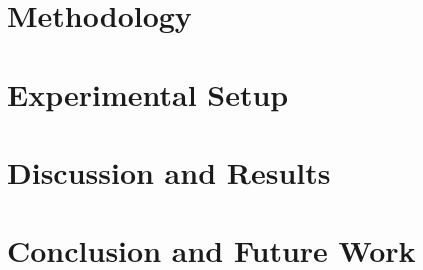 \documentclass[conference,11pt]{IEEEtran}
\begin{document}
\section{Methodology}

    
\section{Experimental Setup}


\section{Discussion and Results}


\section{Conclusion and Future Work}


\medskip



    
\end{document}
